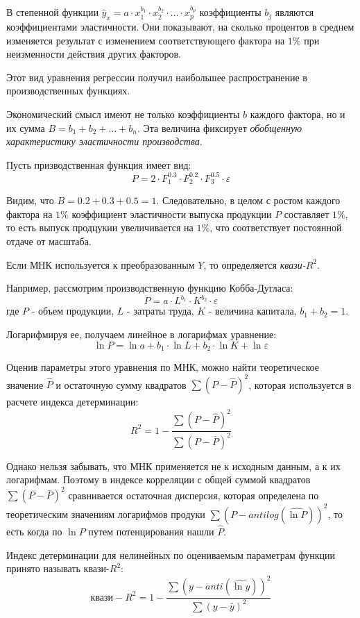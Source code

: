 \documentclass[aps,%
12pt,%
final,%
oneside,
onecolumn,%
musixtex, %
superscriptaddress,%
centertags]{article} %
\theoremstyle{plain}
\theoremstyle{definition}
\theoremstyle{remark}
\begin{document}
В степенной функции $\hat{y}_x = a \cdot x_1^{b_1} \cdot x_2^{b_2} \cdot \ldots \cdot x_p ^{b_p}$ коэффициенты $b_j$ являются коэффициентами эластичности. Они показывают, на сколько процентов в среднем изменяется результат с изменением соответствующего фактора на $1\%$ при неизменности действия других факторов. 

Этот вид уравнения регрессии получил наибольшее распространение в производственных функциях.

Экономический смысл имеют не только коэффициенты $b$ каждого фактора, но и их сумма $B=b_1 + b_2 + \ldots + b_n$. Эта величина фиксирует \textit{обобщенную характеристику эластичности производства}.

Пусть призводственная функция имеет вид:
$$P  = 2 \cdot F_1^{0.3} \cdot F_2^{0.2} \cdot F_3^{0.5} \cdot \varepsilon$$

Видим, что $B = 0.2+0.3+0.5=1$. Следовательно, в целом с ростом каждого фактора на $1\%$ коэффициент эластичности выпуска продукции $P$ составляет $1\%$, то есть выпуск продцукии увеличивается на $1\%$, что соответствует постоянной отдаче от масштаба. 

Если МНК используется к преобразованным $Y$, то определяется \textit{квази-$R^2$}.

Например, рассмотрим производственную функцию Кобба-Дугласа:
$$P = a \cdot L^{b_1} \cdot K^{b_2} \cdot \varepsilon$$
где $P$ - объем продукции, $L$ - затраты труда, $K$ - величина капитала, $b_1 + b_2 = 1$.

Логарифмируя ее, получаем линейное в логарифмах уравнение:
$$\ln P = \ln a + b_1 \cdot \ln L + b_2 \cdot \ln K + \ln \varepsilon$$

Оценив параметры этого уравнения по МНК, можно найти теоретическое значение $\hat{P}$ и остаточную сумму квадратов $\sum\limits (P-\hat{P})^2$, которая используется в расчете индекса детерминации:
$$R^2 = 1 - \frac{\sum (P-\hat{P})^2}{\sum (P-\bar{P})^2}$$

Однако нельзя забывать, что МНК применяется не к исходным данным, а к их логарифмам. Поэтому в индексе корреляции с общей суммой квадратов $\sum (P-\bar{P})^2$ сравнивается остаточная дисперсия, которая определена по теоретическим значениям логарифмов продуки $\sum (P - antilog (\hat{\ln P}))^2$, то есть когда по $\ln P$ путем потенцирования нашли $\hat{P}$.

Индекс детерминации для нелинейных по оцениваемым параметрам функции принято называть квази-$R^2$:
$$\text{квази}-R^2 = 1 - \frac{\sum (y-anti(\hat{\ln y}))^2}{\sum (y-\bar{y})^2}$$
\end{document}
